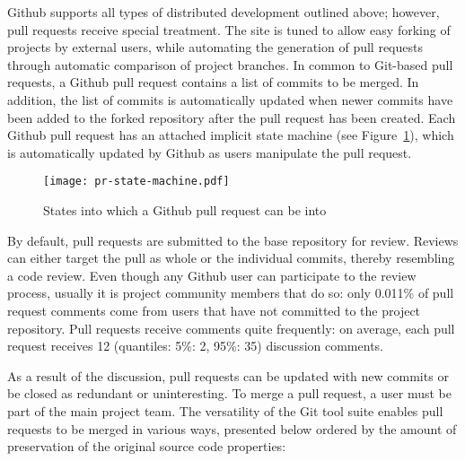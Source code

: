 \documentclass{sig-alternate}
\begin{document}
Github supports all types of distributed development outlined above; however,
pull requests receive special treatment. The site is tuned to allow easy forking
of projects by external users, while automating the generation of pull
requests through automatic comparison of project branches. In common to
Git-based pull requests, a Github pull request contains a list of commits
to be merged. In addition, the list of commits is automatically updated when newer commits have been added to the forked repository after the pull request
has been created. Each Github pull request has an attached implicit state
machine (see Figure~\ref{fig:state}), which is automatically updated by
Github as users manipulate the pull request.

\begin{figure}
  \begin{center}
    \texttt{[image: pr-state-machine.pdf]}
  \end{center}
  \caption{States into which a Github pull request can be into}
  \label{fig:state}
\end{figure}

By default, pull requests are submitted to the base repository for review.
Reviews can either target the pull as whole or the individual commits,
thereby resembling a code review. 
Even though any Github user can participate to the
review process, usually it is project community members that do so:
only 0.011\% of pull request comments come from users that have not
committed to the project repository.
Pull requests receive comments quite frequently: on average, each pull
request receives 12 (quantiles: 5\%: 2, 95\%: 35) discussion comments.

As a result of the discussion, pull requests can be updated with new commits or
be closed as redundant or uninteresting. To merge a pull request, a user must
be part of the main project team. The versatility of the Git tool suite enables
pull requests to be merged in various ways, presented below ordered by
the amount of preservation of the original source code properties:
\end{document}
